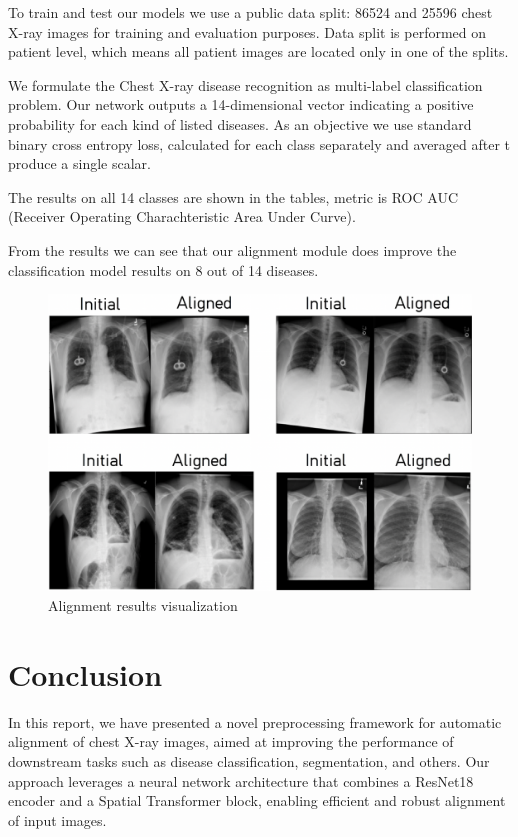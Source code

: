 \documentclass{article}
\begin{document}
To train and test our models we use a public data split: 86524 and 25596 chest 
X-ray images for training and evaluation purposes. Data split is performed on 
patient level, which means all patient images are located only in one of the 
splits.

We formulate the Chest X-ray disease recognition as multi-label classification 
problem. Our network outputs a 14-dimensional vector indicating a positive 
probability for each kind of listed diseases. As an objective we use standard 
binary cross entropy loss, calculated for each class separately and averaged 
after t produce a single scalar.

The results on all 14 classes are shown in the tables, metric is 
ROC AUC (Receiver Operating Charachteristic Area Under Curve).

From the results we can see that our alignment module does improve the classification 
model results on 8 out of 14 diseases.

\begin{figure}[ht]\label{visualization}
    \vskip 0.2in
    \begin{center}
    \centerline{\includegraphics[width=\columnwidth]{../images/alignment_results.png}}
    \caption{Alignment results visualization}
    \end{center}
    \vskip -0.2in
\end{figure}

\section{Conclusion}\label{conclusion}
In this report, we have presented a novel preprocessing framework for automatic 
alignment of chest X-ray images, aimed at improving the performance of 
downstream tasks such as disease classification, segmentation, and others. Our 
approach leverages a neural network architecture that combines a ResNet18 
encoder and a Spatial Transformer block, enabling efficient and robust 
alignment of input images.
\end{document}
